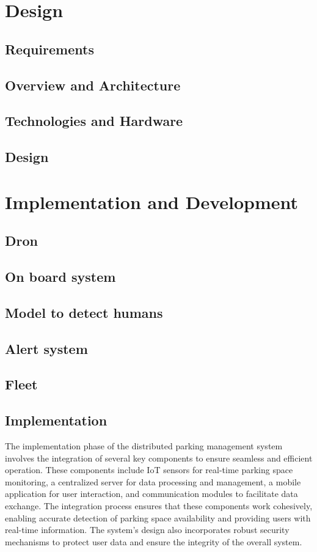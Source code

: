 \documentclass[oneside, 12pt, a4paper, draft]{book}
\begin{document}
\part{Design}
\label{sec:org4707efc}
\chapter{Requirements}
\label{sec:org51d36db}
\chapter{Overview and Architecture}
\label{sec:org51d2824}
\chapter{Technologies and Hardware}
\label{sec:org1a7a91b}
\chapter{Design}
\label{sec:orga621620}
\part{Implementation and Development}
\label{sec:org5f63915}
\chapter{Dron}
\label{sec:org7a5ab64}
\chapter{On board system}
\label{sec:org028ea70}
\chapter{Model to detect humans}
\label{sec:orge8d56a1}
\chapter{Alert system}
\label{sec:orgd2a67c9}
\chapter{Fleet}
\label{sec:org1ef5aa8}
\chapter{Implementation}
\label{sec:org180e2c8}
The implementation phase of the distributed parking management system involves the integration of several key components to ensure seamless and efficient operation. These components include IoT sensors for real-time parking space monitoring, a centralized server for data processing and management, a mobile application for user interaction, and communication modules to facilitate data exchange. The integration process ensures that these components work cohesively, enabling accurate detection of parking space availability and providing users with real-time information. The system's design also incorporates robust security mechanisms to protect user data and ensure the integrity of the overall system.
\end{document}
